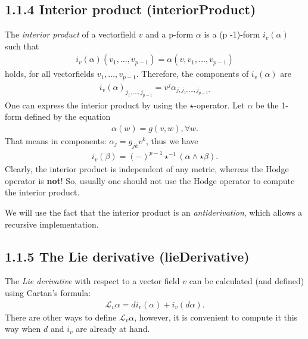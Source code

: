 \documentclass[letterpaper,10pt,english]{sphinxmanual}
\begin{document}
\subsection{1.1.4 Interior product (\textbf{interiorProduct})}
\label{section-1.0:interior-product-interiorproduct}
The \emph{interior product} of a vectorfield \(v\) and a p-form \(\alpha\)
is a (p -1)-form \(i_v (\alpha)\) such that
\begin{equation*}
\begin{split}i_v (\alpha) (v_1, \ldots, v_{p - 1}) = \alpha (v, v_1, \ldots, v_{p - 1})\end{split}
\end{equation*}
holds, for all vectorfields \(v_1, \ldots, v_{p - 1}\). Therefore, the
components of \(i_v (\alpha)\) are
\begin{equation*}
\begin{split}i_v (\alpha)_{j_1, \ldots, j_{p - 1}} = v^j \alpha_{j, j_1, \ldots, j_{p -
  1} .}\end{split}
\end{equation*}
One can express the interior product by using the \(\star\)-operator.
Let \(\alpha\) be the 1-form defined by the equation
\begin{equation*}
\begin{split}\alpha (w) = g (v, w), \forall w.\end{split}
\end{equation*}
That means in components: \(\alpha_j = g_{j k} v^k\),
thus we have
\begin{equation*}
\begin{split}i_v (\beta) = (-)^{p - 1} \star^{- 1} (\alpha \wedge \star \beta) .\end{split}
\end{equation*}
Clearly, the interior product is independent of any metric, whereas the
Hodge operator is \textbf{not}! So, usually one should not use the Hodge
operator to compute the interior product.

We will use the fact that the interior product is an \emph{antiderivation},
which allows a recursive implementation.


\subsection{1.1.5 The Lie derivative (\textbf{lieDerivative})}
\label{section-1.0:the-lie-derivative-liederivative}
The \emph{Lie derivative} with respect to a vector field \(v\) can be
calculated (and defined) using Cartan's formula:
\begin{equation*}
\begin{split}\mathcal{L}_v \alpha = d i_v (\alpha) + i_v (d \alpha).\end{split}
\end{equation*}
There are other ways to define \(\mathcal{L}_v \alpha\), however,
it is convenient to compute it this way when \(d\) and \(i_v\) are
already at hand.
\end{document}
